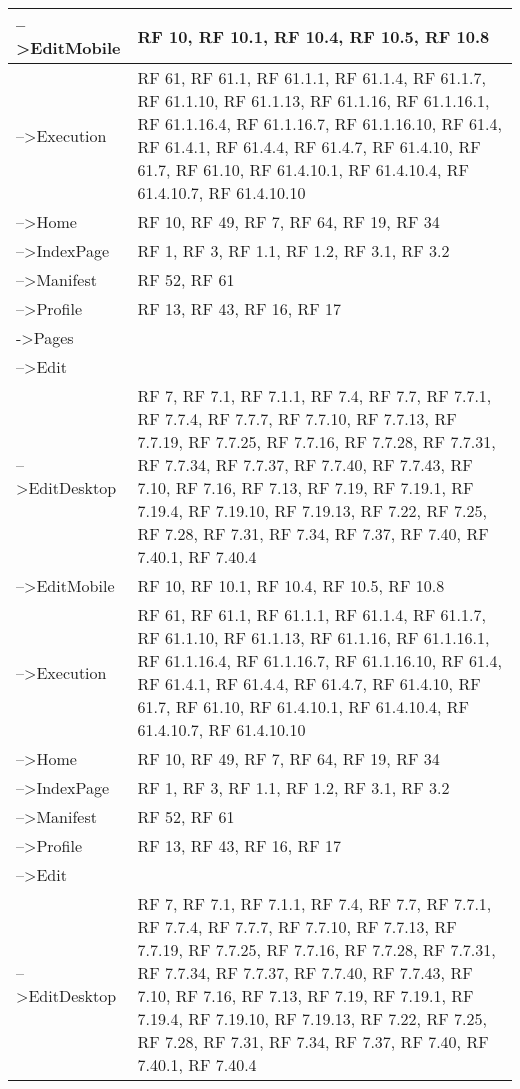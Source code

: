 {\begin{longtable} [c]{| p{8cm} | p{5cm} |}
 \hline 
-->EditMobile & RF 10, RF 10.1, RF 10.4, RF 10.5, RF 10.8\\ 
 \hline 
-->Execution & RF 61, RF 61.1, RF 61.1.1, RF 61.1.4, RF 61.1.7, RF 61.1.10, RF 61.1.13, RF 61.1.16, RF 61.1.16.1, RF 61.1.16.4, RF 61.1.16.7, RF 61.1.16.10, RF 61.4, RF 61.4.1, RF 61.4.4, RF 61.4.7, RF 61.4.10, RF 61.7, RF 61.10, RF 61.4.10.1, RF 61.4.10.4, RF 61.4.10.7, RF 61.4.10.10\\ 
 \hline 
-->Home & RF 10, RF 49, RF 7, RF 64, RF 19, RF 34\\ 
 \hline 
-->IndexPage & RF 1, RF 3, RF 1.1, RF 1.2, RF 3.1, RF 3.2\\ 
 \hline 
-->Manifest & RF 52, RF 61\\ 
 \hline 
-->Profile & RF 13, RF 43, RF 16, RF 17\\ 
 \hline 
->Pages & \\ 
 \hline 
-->Edit & \\ 
 \hline 
-->EditDesktop & RF 7, RF 7.1, RF 7.1.1, RF 7.4, RF 7.7, RF 7.7.1, RF 7.7.4, RF 7.7.7, RF 7.7.10, RF 7.7.13, RF 7.7.19, RF 7.7.25, RF 7.7.16, RF 7.7.28, RF 7.7.31, RF 7.7.34, RF 7.7.37, RF 7.7.40, RF 7.7.43, RF 7.10, RF 7.16, RF 7.13, RF 7.19, RF 7.19.1, RF 7.19.4, RF 7.19.10, RF 7.19.13, RF 7.22, RF 7.25, RF 7.28, RF 7.31, RF 7.34, RF 7.37, RF 7.40, RF 7.40.1, RF 7.40.4\\ 
 \hline 
-->EditMobile & RF 10, RF 10.1, RF 10.4, RF 10.5, RF 10.8\\ 
 \hline 
-->Execution & RF 61, RF 61.1, RF 61.1.1, RF 61.1.4, RF 61.1.7, RF 61.1.10, RF 61.1.13, RF 61.1.16, RF 61.1.16.1, RF 61.1.16.4, RF 61.1.16.7, RF 61.1.16.10, RF 61.4, RF 61.4.1, RF 61.4.4, RF 61.4.7, RF 61.4.10, RF 61.7, RF 61.10, RF 61.4.10.1, RF 61.4.10.4, RF 61.4.10.7, RF 61.4.10.10\\ 
 \hline 
-->Home & RF 10, RF 49, RF 7, RF 64, RF 19, RF 34\\ 
 \hline 
-->IndexPage & RF 1, RF 3, RF 1.1, RF 1.2, RF 3.1, RF 3.2\\ 
 \hline 
-->Manifest & RF 52, RF 61\\ 
 \hline 
-->Profile & RF 13, RF 43, RF 16, RF 17\\ 
 \hline 
-->Edit & \\ 
 \hline 
-->EditDesktop & RF 7, RF 7.1, RF 7.1.1, RF 7.4, RF 7.7, RF 7.7.1, RF 7.7.4, RF 7.7.7, RF 7.7.10, RF 7.7.13, RF 7.7.19, RF 7.7.25, RF 7.7.16, RF 7.7.28, RF 7.7.31, RF 7.7.34, RF 7.7.37, RF 7.7.40, RF 7.7.43, RF 7.10, RF 7.16, RF 7.13, RF 7.19, RF 7.19.1, RF 7.19.4, RF 7.19.10, RF 7.19.13, RF 7.22, RF 7.25, RF 7.28, RF 7.31, RF 7.34, RF 7.37, RF 7.40, RF 7.40.1, RF 7.40.4\\ 

\end{longtable}}
